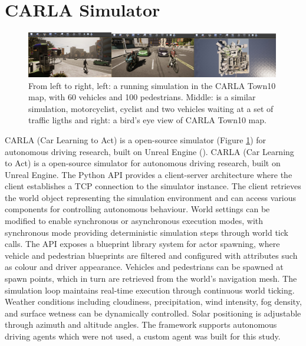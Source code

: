 \section{CARLA Simulator}
\label{methods:carla}

\begin{figure}[h]
\centering
\includegraphics[width=0.99\textwidth]{Figures/Methods/CarlaTown10.png}
\caption{From left to right, left: a running simulation in the CARLA Town10 map, with 60 vehicles and 100 pedestrians. Middle: is a similar simulation, motorcyclist, cyclist and two vehicles waiting at a set of traffic ligths and right: a bird's eye view of CARLA Town10 map.}
\label{fig:CarlaTown10}
\end{figure}

CARLA (Car Learning to Act) is a open-source simulator (Figure \ref{fig:CarlaTown10}) for autonomous driving research, built on Unreal Engine (\cite{unrealengine}). CARLA (Car Learning to Act) is a open-source simulator for autonomous driving research, built on Unreal Engine. The Python API provides a client-server architecture where the client establishes a TCP connection to the simulator instance. The client retrieves the world object representing the simulation environment and can access various components for controlling autonomous behaviour. World settings can be modified to enable synchronous or asynchronous execution modes, with synchronous mode providing deterministic simulation steps through world tick calls. The API exposes a blueprint library system for actor spawning, where vehicle and pedestrian blueprints are filtered and configured with attributes such as colour and driver appearance. Vehicles and pedestrians can be spawned at spawn points, which in turn are retrieved from the world's navigation mesh. The simulation loop maintains real-time execution through continuous world ticking. Weather conditions including cloudiness, precipitation, wind intensity, fog density, and surface wetness can be dynamically controlled. Solar positioning is adjustable through azimuth and altitude angles. The framework supports autonomous driving agents which were not used, a custom agent was built for this study. 

